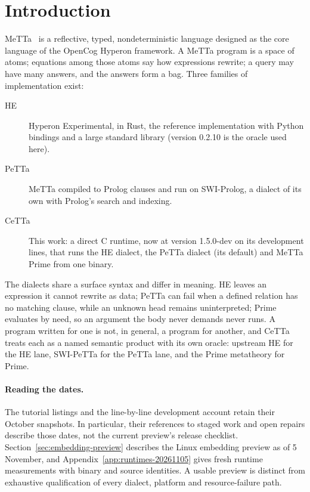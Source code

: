 \documentclass[11pt]{article}
\newcommand{\PeTTa}{\textup{PeTTa}}
\newcommand{\HE}{\textup{HE}}
\newcommand{\CeTTa}{\textup{CeTTa}}
\begin{document}
\section{Introduction}
\label{sec:intro}

MeTTa~\cite{metta} is a reflective, typed, nondeterministic language
designed as the core language of the OpenCog Hyperon framework.  A MeTTa
program is a space of atoms; equations among those atoms say how expressions
rewrite; a query may have many answers, and the answers form a bag.  Three
families of implementation exist:

\begin{description}
\item[\HE{}] Hyperon Experimental, in Rust, the reference implementation with
  Python bindings and a large standard library (version 0.2.10 is the
  oracle used here).
\item[\PeTTa{}] MeTTa compiled to Prolog clauses and run on SWI-Prolog, a
  dialect of its own with Prolog's search and indexing.
\item[\CeTTa{}] This work: a direct C runtime, now at version 1.5.0-dev on its
  development lines, that runs the \HE{} dialect, the \PeTTa{} dialect (its
  default) and MeTTa Prime from one binary.
\end{description}

\noindent
The dialects share a surface syntax and differ in meaning.  \HE{} leaves an
expression it cannot rewrite as data; \PeTTa{} can fail when a defined
relation has no matching clause, while an unknown head remains uninterpreted;
Prime evaluates by need, so an argument the body never demands
never runs.  A program written for one is not, in general, a program for
another, and \CeTTa{} treats each as a named semantic product with its own
oracle: upstream \HE{} for the \HE{} lane, SWI-\PeTTa{} for the \PeTTa{} lane,
and the Prime metatheory for Prime.

\paragraph{Reading the dates.}  The tutorial listings and the line-by-line
development account retain their October snapshots.  In particular, their
references to staged work and open repairs describe those dates, not the
current preview's release checklist.  Section~\ref{sec:embedding-preview}
describes the Linux embedding preview as of 5 November, and
Appendix~\ref{app:runtimes-20261105} gives fresh runtime measurements with
binary and source identities.  A usable preview is distinct from exhaustive
qualification of every dialect, platform and resource-failure path.
\end{document}
